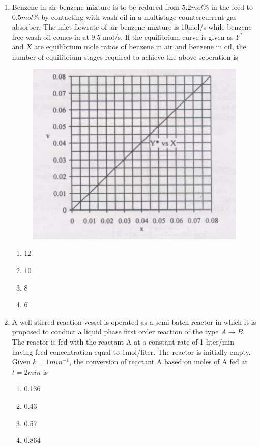 \documentclass[journal,12pt,onecolumn]{IEEEtran}
\theoremstyle{remark}
\begin{document}
\begin{enumerate}
    \item Benzene in air benzene mixture is to be reduced from $5.2mol\%$ in the feed to $0.5mol\%$
 by contacting with wash oil in a multistage countercurrent gas absorber. The inlet flowrate of air benzene mixture is 10mol/s while benzene free wash oil comes in at 9.5 mol/s. If the equilibrium curve is given as $Y^*$ and $X$ are equilibrium mole ratios of benzene in air and benzene in oil, the number of equilibrium stages required to achieve the above seperation is 

 \begin{figure}[H]
     \centering
     \includegraphics[width=0.5\columnwidth]{figs/51.png}
     \caption{}
     \label{fig:51}
 \end{figure}

 \begin{multicols}{4}
     \begin{enumerate}
         \item 12
         \item 10
         \item 8
         \item 6
     \end{enumerate}
 \end{multicols}
 
    \item A well stirred reaction vessel is operated as a semi batch reactor in which it is proposed to conduct a liquid phase first order reaction of the type $A\to B$. The reactor is fed with the reactant A at  a constant rate of 1 liter/min having feed concentration equal to 1mol/liter. The reactor is initially empty. Given $k=1min^{-1}$, the conversion of reactant A based on moles of A fed at $t=2min$ is

    \begin{multicols}{4}
        \begin{enumerate}
            \item 0.136
            \item 0.43
            \item 0.57
            \item 0.864
        \end{enumerate}
    \end{multicols}


\end{enumerate}
\end{document}
